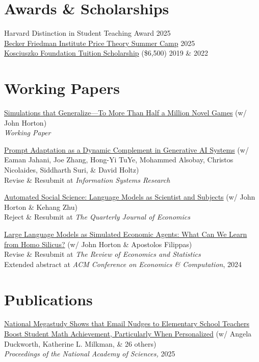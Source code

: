 \documentclass[margin,line,pifont,palatino,courier, 9pt]{res}
\begin{document}
\begin{resume}
\section{\sc Awards \& Scholarships}
Harvard Distinction in Student Teaching Award \hfill 2025 \\
\href{https://bfi.uchicago.edu/events/event/2025-price-theory-summer-camp/}{Becker Friedman Institute Price Theory Summer Camp} \hfill 2025 \\
\href{https://thekf.org/scholarship/tuition-scholarships/tuition-scholarships-for-graduate-studies/}{Kosciuszko Foundation Tuition Scholarship} (\$6,500) \hfill 2019 \& 2022 


\section{\sc Working Papers}

\href{https://github.com/benjamin-manning/website_benjaminmanning.io/blob/master/static/files/optimize.pdf}{Simulations that Generalize---To More Than Half a Million Novel Games} (w/ John Horton)\\
\textit{Working Paper}

\href{https://arxiv.org/abs/2407.14333}{Prompt Adaptation as a Dynamic Complement in Generative AI Systems} (w/ Eaman Jahani, Joe Zhang, Hong-Yi TuYe, Mohammed Alsobay, Christos Nicolaides, Siddharth
Suri, \& David Holtz)\\
Revise \& Resubmit at \textit{Information Systems Research}

\href{https://www.nber.org/papers/w32381}{Automated Social Science: Language Models as Scientist and Subjects} (w/ John Horton \& Kehang Zhu)\\
Reject \& Resubmit at \textit{The Quarterly Journal of Economics}

\href{https://www.nber.org/papers/w31122}{Large Language Models as Simulated Economic Agents: What Can We Learn from Homo Silicus?} (w/ John Horton \& Apostolos Filippas)\\
Revise \& Resubmit at \textit{The Review of Economics and Statistics}\\
Extended abstract at \textit{ACM Conference on Economics \& Computation}, 2024


\section{\sc Publications}
\href{https://www.pnas.org/doi/10.1073/pnas.2418616122}{National Megastudy Shows that Email Nudges to Elementary School Teachers Boost Student Math Achievement, Particularly When Personalized} (w/ Angela Duckworth, Katherine L. Milkman, \& 26 others)\\
\textit{Proceedings of the National Academy of Sciences,} 2025


\end{resume}
\end{document}
